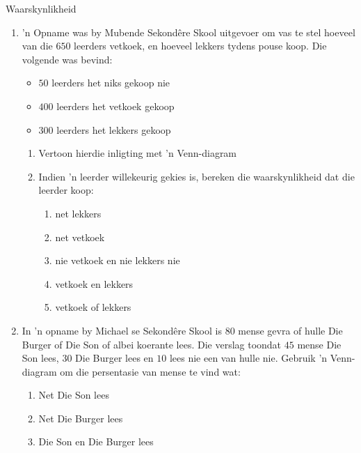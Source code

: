 \begin{eocexercises}{Waarskynlikheid}
\begin{enumerate}[itemsep=5pt, label=\textbf{\arabic*}.]
  \item 'n Opname was by Mubende Sekondêre Skool uitgevoer om vas te stel hoeveel van die $ 650 $ leerders vetkoek, en hoeveel lekkers tydens pouse koop. Die volgende was bevind:
\begin{itemize}
 \item $50$ leerders het niks gekoop nie
\item $400$ leerders het vetkoek gekoop
\item $300$ leerders het lekkers gekoop
\end{itemize}
\begin{enumerate}[noitemsep, label=\textbf{(\alph*)} ]
 \item Vertoon hierdie inligting met 'n Venn-diagram
\item Indien 'n leerder willekeurig gekies is, bereken die waarskynlikheid dat die leerder koop:
\begin{enumerate}[noitemsep, label=\roman*. ]
 \item net lekkers
\item net vetkoek
\item nie vetkoek en nie lekkers nie
\item vetkoek en lekkers
\item vetkoek of lekkers
\end{enumerate}
\end{enumerate}
\item In 'n opname by Michael se Sekondêre Skool is $80$ mense gevra of hulle Die Burger of Die Son of albei koerante lees. Die verslag toondat $45$ mense Die Son lees, $30$ Die Burger lees en $10$ lees nie een van hulle nie. Gebruik 'n Venn-diagram om die persentasie van mense te vind wat:
\begin{enumerate}[noitemsep, label=\textbf{(\alph*)} ]
 \item Net Die Son lees
\item Net Die Burger lees
\item Die Son en Die Burger lees
\end{enumerate}

  \end{enumerate}

\end{eocexercises}
